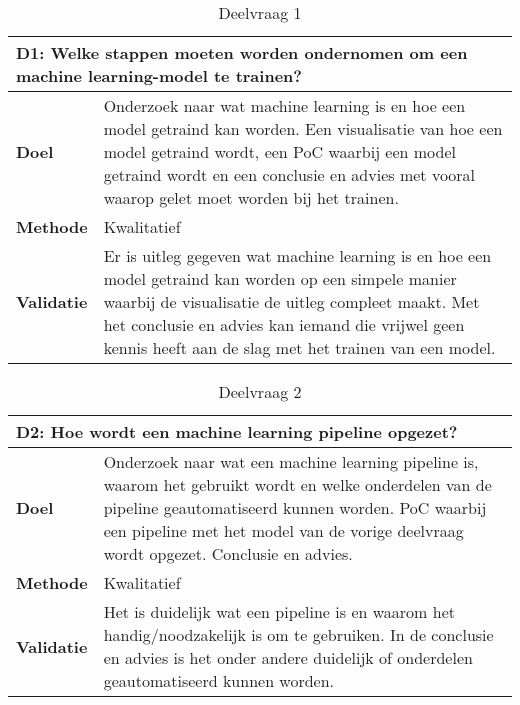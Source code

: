 
{\renewcommand{\arraystretch}{1.35}%

\begin{table}[hbt!]
\centering
\begin{tabular}{|l|p{.83\linewidth}|}
\hline
\multicolumn{2}{|p{.97\linewidth}|}{\textbf{D1: Welke stappen moeten worden ondernomen om een machine learning-model te trainen?}} \\ \hline
  \textbf{Doel}&
    Onderzoek naar wat machine learning is en hoe een model getraind kan worden. Een visualisatie van hoe een model getraind wordt, een PoC waarbij een model getraind wordt en een conclusie en advies met vooral waarop gelet moet worden bij het trainen.
  \\ \hline
  \textbf{Methode}&
    Kwalitatief
  \\ \hline
  \textbf{Validatie}&
    Er is uitleg gegeven wat machine learning is en hoe een model getraind kan worden op een simpele manier waarbij de visualisatie de uitleg compleet maakt. Met het conclusie en advies kan iemand die vrijwel geen kennis heeft aan de slag met het trainen van een model.
  \\ \hline
\end{tabular}
\caption{Deelvraag 1}
\label{table:sq1}
\end{table}

\begin{table}[hbt!]
\centering
\begin{tabular}{|l|p{.83\linewidth}|}
\hline
\multicolumn{2}{|p{.97\linewidth}|}{\textbf{D2: Hoe wordt een machine learning pipeline opgezet?}} \\ \hline
  \textbf{Doel}&
    Onderzoek naar wat een machine learning pipeline is, waarom het gebruikt wordt en welke onderdelen van de pipeline geautomatiseerd kunnen worden. PoC waarbij een pipeline met het model van de vorige deelvraag wordt opgezet. Conclusie en advies.
  \\ \hline
  \textbf{Methode}&
    Kwalitatief
  \\ \hline
  \textbf{Validatie}&
    Het is duidelijk wat een pipeline is en waarom het handig/noodzakelijk is om te gebruiken. In de conclusie en advies is het onder andere duidelijk of onderdelen geautomatiseerd kunnen worden.
  \\ \hline
\end{tabular}
\caption{Deelvraag 2}
\label{table:sq2}
\end{table}

}
